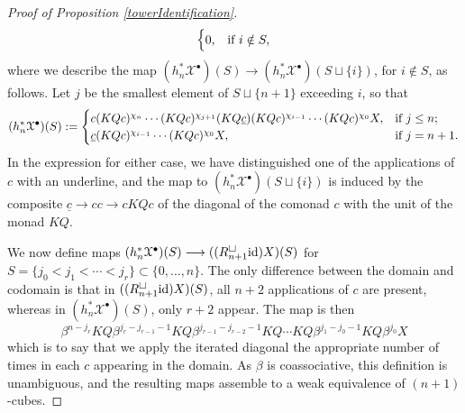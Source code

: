 \documentclass[11pt]{amsart}
\theoremstyle{plain}
\theoremstyle{definition}
\renewcommand{\to}{\longrightarrow}
\newcommand{\calX}{\mathcal{X}}
\theoremstyle{plain}
\newcommand{\Id}{\textup{id}}
\newcommand{\plainD}{R}
\begin{document}
\begin{Bousfield-Kan spectral sequence}
\begin{proof}[Proof of Proposition \ref{towerIdentification}]
\[\begin{cases}
0,&\textup{if }i\notin S,
\end{cases}
\]
where we describe the map $(h_n^*\calX^\bullet)(S)\to (h_n^*\calX^\bullet)(S\sqcup\{i\})$, for $i\notin S$, as follows. Let $j$ be the smallest element of $S\sqcup\{n+1\}$ exceeding $i$, so that
\[(h_n^*\calX^\bullet)(S):= \begin{cases}
c(KQc)^{\chi_{n}}\cdots (KQc)^{\chi_{j+1}}(KQ\underline{c})(KQc)^{\chi_{i-1}}\cdots (KQc)^{\chi_0}X,&\textup{if }j\leq n;\\
\underline{c}(KQc)^{\chi_{i-1}}\cdots (KQc)^{\chi_0}X,&\textup{if }j=n+1.
\end{cases}
\]
In the expression for either case, we have distinguished one of the applications of $c$ with an underline, and the map to $(h_n^*\calX^\bullet)(S\sqcup\{i\})$ is induced by the composite $\underline{c}\to cc\to cKQc$ of the diagonal of the comonad $c$ with the unit of the monad $KQ$. 

We now define maps $(h_n^*\calX^\bullet)(S)\to (({\plainD}_{n+1}^{\smash{\square}}\Id )X)(S)$ for $S=\{j_0<j_1<\cdots<j_r\}\subset\{0,\ldots,n\}$. 
The only difference between the domain and codomain is that in $(({\plainD}_{n+1}^{\smash{\square}}\Id )X)(S)$, all $n+2$ applications of $c$ are present, whereas in $(h_n^*\calX^\bullet)(S)$, only $r+2$ appear. The map is then
\[\beta^{n-j_r}KQ\beta^{j_r-j_{r-1}-1}KQ\beta^{j_{r-1}-j_{r-2}-1}KQ\cdots KQ\beta^{j_{1}-j_0-1}KQ\beta^{j_0}X\]
which is to say that we apply the iterated diagonal the appropriate number of times in each $c$ appearing in the domain. As $\beta$ is coassociative, this definition is unambiguous, and the resulting maps assemble to a weak equivalence of $(n+1)$-cubes. 
\end{proof}


\end{Bousfield-Kan spectral sequence}
\end{document}

